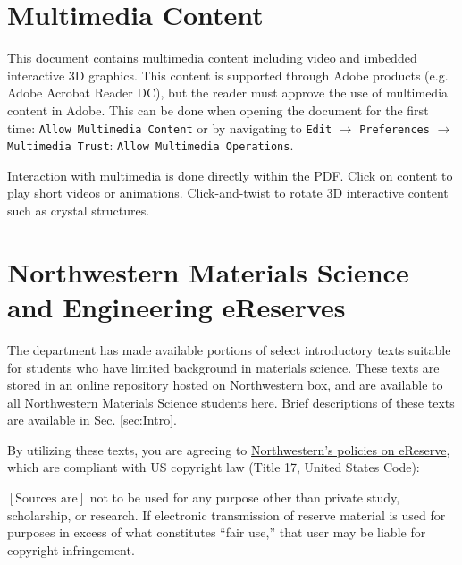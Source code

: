 \documentclass[11pt]{article}
\begin{document}
\section*{Multimedia Content}
This document contains multimedia content including video and imbedded interactive 3D graphics. This content is supported through Adobe products (e.g. Adobe Acrobat Reader DC), but the reader must approve the use of multimedia content in Adobe. This can be done when opening the document for the first time: \verb=Allow Multimedia Content= or by navigating to \texttt{Edit} $\rightarrow$ \texttt{Preferences} $\rightarrow$ \texttt{Multimedia Trust}: \texttt{Allow Multimedia Operations}.

Interaction with multimedia is done directly within the PDF. Click on content to play short videos or animations. Click-and-twist to rotate 3D interactive content such as crystal structures.

\section*{Northwestern Materials Science and Engineering eReserves}
The department has made available portions of select introductory texts suitable for students who have limited background in materials science. These texts are stored in an online repository hosted on Northwestern box, and are available to all Northwestern Materials Science students \href{https://northwestern.box.com/s/13myp0an8snmmfjqfbx9gt1gbfrah0aj}{here}. Brief descriptions of these texts are available in Sec. \ref{sec:Intro}.

By utilizing these texts, you are agreeing to \href{is not to be used for any purpose other than private study, scholarship, or research. If electronic transmission of reserve material is used for purposes in excess of what constitutes ``fair use'', that user may be liable for copyright infringement.}{Northwestern's policies on eReserve}, which are compliant with US copyright law (Title 17, United States Code): 

\begin{displayquote}
$\left[\text{Sources are}\right]$ not to be used for any purpose other than private study, scholarship, or research. If electronic transmission of reserve material is used for purposes in excess of what constitutes ``fair use,'' that user may be liable for copyright infringement.
\end{displayquote}
\newpage
\end{document}
